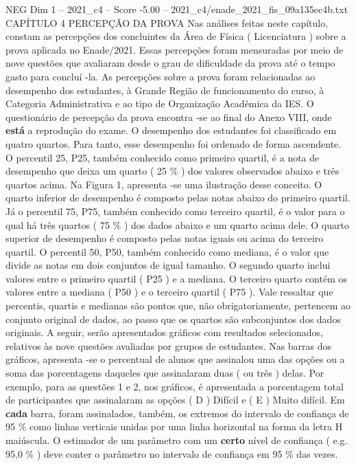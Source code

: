 \begin{textsample}{NEG Dim 1 – 2021\_c4 – Score -5.00 – 2021\_c4/enade\_2021\_fis\_09a135ec4b.txt}  \label{ex:f1_neg_065}
CAPÍTULO 4 PERCEPÇÃO DA PROVA Nas análises feitas neste capítulo, constam as percepções dos concluintes da Área de Física ( Licenciatura ) sobre a prova aplicada no Enade/2021.
Essas percepções foram mensuradas por meio de nove questões que avaliaram desde o grau de dificuldade da prova até o tempo gasto para concluí -la.
As percepções sobre a prova foram relacionadas ao desempenho dos estudantes, à Grande Região de funcionamento do curso, à Categoria Administrativa e ao tipo de Organização Acadêmica da IES.
O questionário de percepção da prova encontra -se ao final do Anexo VIII, onde \textbf{está} a reprodução do exame.
O desempenho dos estudantes foi classificado em quatro quartos.
Para tanto, esse desempenho foi ordenado de forma ascendente.
O percentil 25, P25, também conhecido como primeiro quartil, é a nota de desempenho que deixa um quarto ( 25 \% ) dos valores observados abaixo e três quartos acima.
Na Figura 1, apresenta -se uma ilustração desse conceito.
O quarto inferior de desempenho é composto pelas notas abaixo do primeiro quartil.
Já o percentil 75, P75, também conhecido como terceiro quartil, é o valor para o qual há três quartos ( 75 \% ) dos dados abaixo e um quarto acima dele.
O quarto superior de desempenho é composto pelas notas iguais ou acima do terceiro quartil.
O percentil 50, P50, também conhecido como mediana, é o valor que divide as notas em dois conjuntos de igual tamanho.
O segundo quarto inclui valores entre o primeiro quartil ( P25 ) e a mediana.
O terceiro quarto contém os valores entre a mediana ( P50 ) e o terceiro quartil ( P75 ).
Vale ressaltar que percentis, quartis e medianas são pontos que, não obrigatoriamente, pertencem ao conjunto original de dados, ao passo que os quartos são subconjuntos dos dados originais.
A seguir, serão apresentados gráficos com resultados selecionados, relativos às nove questões avaliadas por grupos de estudantes.
Nas barras dos gráficos, apresenta -se o percentual de alunos que assinalou uma das opções ou a soma das porcentagens daqueles que assinalaram duas ( ou três ) delas.
Por exemplo, para as questões 1 e 2, nos gráficos, é apresentada a porcentagem total de participantes que assinalaram as opções ( D ) Difícil e ( E ) Muito difícil.
Em \textbf{cada} barra, foram assinalados, também, os extremos do intervalo de confiança de 95 \% como linhas verticais unidas por uma linha horizontal na forma da letra H maiúscula.
O estimador de um parâmetro com um \textbf{certo} nível de confiança ( e.g. 95,0 \% ) deve conter o parâmetro no intervalo de confiança em 95 \% das vezes.

\end{textsample}

